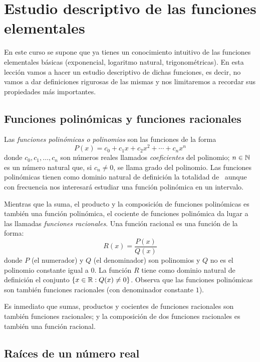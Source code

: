 \section[Estudio descriptivo de las funciones elementales]{{Estudio descriptivo de las funciones elementales}}

En este curso se supone que ya tienes un conocimiento intuitivo de
las funciones elementales básicas (exponencial, logaritmo natural,
trigonométricas). En esta lección vamos a hacer un estudio descriptivo
de dichas funciones, es decir, no vamos a dar definiciones rigurosas
de las mismas y nos limitaremos a recordar sus propiedades más importantes.

\subsection{Funciones polinómicas y funciones racionales}

\noindent Las \emph{funciones polinómicas o polinomios} son las funciones
de la forma 
\[
P(x)=c_{0}+c_{1}x+c_{2}x^{2}+\cdots+c_{n}x^{n}
\]
donde $c_{0},c_{1},\dots,c_{n}$ son números reales llamados \emph{coeficientes}
del polinomio; $n\in\mathbb N$ es un número natural que, si $c_{n}\neq0$,
se llama grado del polinomio. Las funciones polinómicas tienen como
dominio natural de definición la totalidad de \R\ aunque con frecuencia
nos interesará estudiar una función polinómica en un intervalo.

Mientras que la suma, el producto y la composición de funciones polinómicas
es también una función polinómica, el cociente de funciones polinómica
da lugar a las llamadas \emph{funciones racionales}. Una función racional
es una función de la forma: 
\[
R(x)=\frac{P(x)}{Q(x)}
\]
donde $P$ (el numerador) y $Q$ (el denominador) son polinomios y
$Q$ no es el polinomio constante igual a $0$. La función $R$ tiene
como dominio natural de definición el conjunto\linebreak{}
$\{x\in\mathbb R:Q(x)\neq0\}$. Observa que las funciones polinómicas son
también funciones racionales (con denominador constante $1$).

Es inmediato que sumas, productos y cocientes de funciones racionales
son también funciones racionales; y la composición de dos funciones
racionales es también una función racional.

\subsection{Raíces de un número real}

